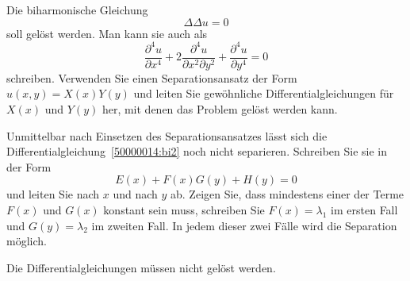 Die biharmonische Gleichung
\begin{equation}
\Delta\Delta u =0
\label{50000014:bi}
\end{equation}
soll
gelöst werden.
Man kann sie auch als
\begin{equation}
\frac{\partial^4u}{\partial x^4}
+
2\frac{\partial^4u}{\partial x^2\partial y^2}
+
\frac{\partial^4u}{\partial y^4}
=
0
\label{50000014:bi2}
\end{equation}
schreiben.
Verwenden Sie einen Separationsansatz der Form $u(x,y)=X(x)Y(y)$
und leiten Sie gewöhnliche Differentialgleichungen für $X(x)$ und $Y(y)$
her, mit denen das Problem gelöst werden kann.

\begin{hinweis}
Unmittelbar nach Einsetzen des Separationsansatzes lässt sich die 
Differentialgleichung~\eqref{50000014:bi2} noch nicht separieren.
Schreiben Sie sie in der Form
\[
E(x) + F(x)G(y) + H(y) = 0
\]
und leiten Sie nach $x$ und nach $y$ ab.
Zeigen Sie, dass mindestens einer der Terme $F(x)$ und $G(x)$ konstant
sein muss, schreiben Sie $F(x)=\lambda_1$ im ersten Fall und $G(y)=\lambda_2$ 
im zweiten Fall.
In jedem dieser zwei Fälle wird die Separation möglich.

Die Differentialgleichungen müssen nicht gelöst werden.
\end{hinweis}

